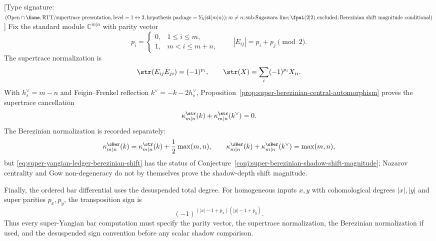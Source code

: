 \begin{proposition}
\label{prop:super-yangian-parity-sign-ledger}
\textup{[}Type signature:
$(\mathrm{Open}\cap\Eone,\mathrm{RTT/supertrace\ presentation},
\mathrm{level}=1\leftrightarrow 2,
\mathrm{hypothesis\ package}=Y_\hbar(\mathfrak{sl}(m|n));
m\ne n;
\mathrm{sub\text{-}Sugawara\ line};
\fpsl(2|2)\ \mathrm{excluded};
\mathrm{Berezinian\ shift\ magnitude\ conditional})$\textup{]}
Fix the standard module $\mathbb C^{m|n}$ with parity vector
\begin{equation}
\label{eq:super-yangian-ledger-parity}
p_i=
\begin{cases}
0,&1\le i\le m,\\
1,&m<i\le m+n,
\end{cases}
\qquad
|E_{ij}|=p_i+p_j\pmod 2 .
\end{equation}
The supertrace normalization is
\begin{equation}
\label{eq:super-yangian-ledger-supertrace}
\str(E_{ij}E_{ji})=(-1)^{p_i},\qquad
\str(X)=\sum_i(-1)^{p_i}X_{ii}.
\end{equation}
With $h_s^\vee=m-n$ and Feigin--Frenkel reflection
$k^\vee=-k-2h_s^\vee$, Proposition~\ref{prop:super-berezinian-central-automorphism}
proves the supertrace cancellation
\begin{equation}
\label{eq:super-yangian-ledger-supertrace-sum}
\kappa^{\str}_{m|n}(k)+\kappa^{\str}_{m|n}(k^\vee)=0.
\end{equation}
The Berezinian normalization is recorded separately:
\begin{equation}
\label{eq:super-yangian-ledger-berezinian-shift}
\kappa^{\sBer}_{m|n}(k)
=\kappa^{\str}_{m|n}(k)+\frac12\max(m,n),
\qquad
\kappa^{\sBer}_{m|n}(k)+\kappa^{\sBer}_{m|n}(k^\vee)=\max(m,n),
\end{equation}
but \eqref{eq:super-yangian-ledger-berezinian-shift} has the status of
Conjecture~\ref{conj:super-berezinian-shadow-shift-magnitude}; Nazarov
centrality and Gow non-degeneracy do not by themselves prove the
shadow-depth shift magnitude.

Finally, the ordered bar differential uses the desuspended total
degree. For homogeneous inputs $x,y$ with cohomological degrees
$|x|,|y|$ and super parities $p_x,p_y$, the transposition sign is
\begin{equation}
\label{eq:super-yangian-ledger-bar-sign}
(-1)^{(|x|-1+p_x)(|y|-1+p_y)}.
\end{equation}
Thus every super-Yangian bar computation must specify the parity vector,
the supertrace normalization, the Berezinian normalization if used, and
the desuspended sign convention before any scalar shadow comparison.
\end{proposition}

